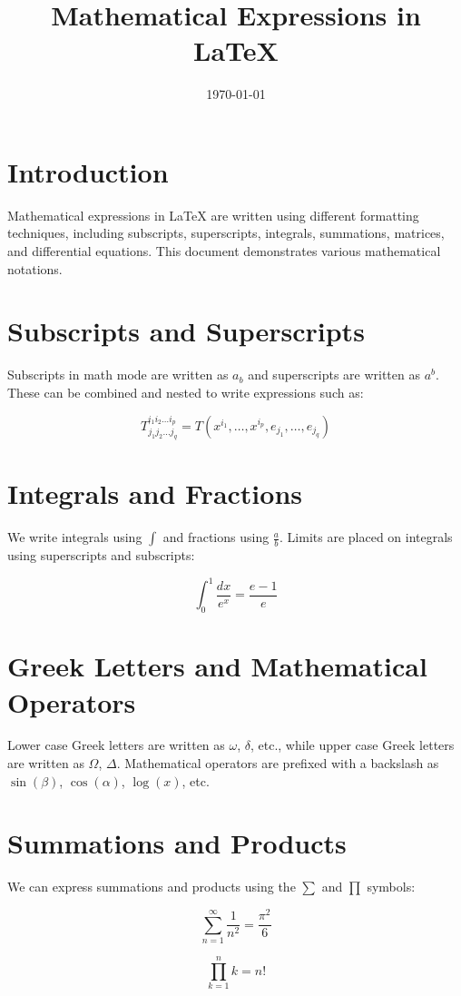 \documentclass{article}
\title{Mathematical Expressions in LaTeX}
\date{\today}
\begin{document}
\maketitle

\section{Introduction}
Mathematical expressions in LaTeX are written using different formatting techniques, including subscripts, superscripts, integrals, summations, matrices, and differential equations. This document demonstrates various mathematical notations.

\section{Subscripts and Superscripts}
Subscripts in math mode are written as $a_b$ and superscripts are written as $a^b$. These can be combined and nested to write expressions such as:

\[ T^{i_1 i_2 \dots i_p}_{j_1 j_2 \dots j_q} = T(x^{i_1},\dots,x^{i_p},e_{j_1},\dots,e_{j_q}) \]

\section{Integrals and Fractions}
We write integrals using $\int$ and fractions using $\frac{a}{b}$. Limits are placed on integrals using superscripts and subscripts:

\[ \int_0^1 \frac{dx}{e^x} =  \frac{e-1}{e} \]

\section{Greek Letters and Mathematical Operators}
Lower case Greek letters are written as $\omega$, $\delta$, etc., while upper case Greek letters are written as $\Omega$, $\Delta$. Mathematical operators are prefixed with a backslash as $\sin(\beta)$, $\cos(\alpha)$, $\log(x)$, etc.

\section{Summations and Products}
We can express summations and products using the $\sum$ and $\prod$ symbols:

\[ \sum_{n=1}^{\infty} \frac{1}{n^2} = \frac{\pi^2}{6} \]

\[ \prod_{k=1}^{n} k = n! \]
\end{document}
